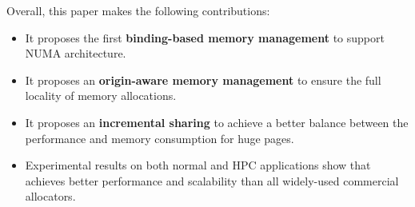 
Overall, this paper makes the following contributions:

\begin{itemize}

 \item It proposes the first \textbf{binding-based memory management} to support NUMA architecture.

\item It proposes an \textbf{origin-aware memory management} to ensure the full locality of memory allocations. 

\item It proposes an \textbf{incremental sharing} to achieve a better balance between the performance and memory consumption for huge pages. 



\item Experimental results on both normal and HPC applications show that \NM{} achieves better performance and scalability than all widely-used commercial allocators. 




\end{itemize}

